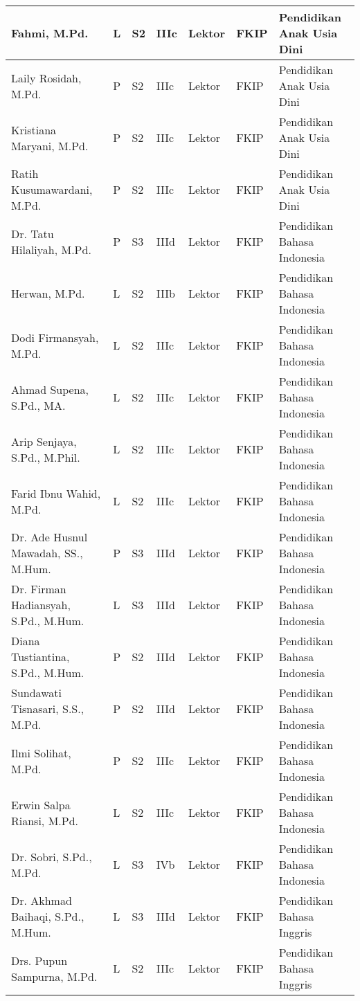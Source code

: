 \documentclass[
]{book}
\begin{document}
\begin{longtable}{l|l|l|l|l|l|l}
\hline
Fahmi, M.Pd. & L & S2 & IIIc & Lektor & FKIP & Pendidikan Anak Usia Dini\\
\hline
Laily Rosidah, M.Pd. & P & S2 & IIIc & Lektor & FKIP & Pendidikan Anak Usia Dini\\
\hline
Kristiana Maryani, M.Pd. & P & S2 & IIIc & Lektor & FKIP & Pendidikan Anak Usia Dini\\
\hline
Ratih Kusumawardani, M.Pd. & P & S2 & IIIc & Lektor & FKIP & Pendidikan Anak Usia Dini\\
\hline
Dr. Tatu Hilaliyah, M.Pd. & P & S3 & IIId & Lektor & FKIP & Pendidikan Bahasa Indonesia\\
\hline
Herwan, M.Pd. & L & S2 & IIIb & Lektor & FKIP & Pendidikan Bahasa Indonesia\\
\hline
Dodi Firmansyah, M.Pd. & L & S2 & IIIc & Lektor & FKIP & Pendidikan Bahasa Indonesia\\
\hline
Ahmad Supena, S.Pd., MA. & L & S2 & IIIc & Lektor & FKIP & Pendidikan Bahasa Indonesia\\
\hline
Arip Senjaya, S.Pd., M.Phil. & L & S2 & IIIc & Lektor & FKIP & Pendidikan Bahasa Indonesia\\
\hline
Farid Ibnu Wahid, M.Pd. & L & S2 & IIIc & Lektor & FKIP & Pendidikan Bahasa Indonesia\\
\hline
Dr. Ade Husnul Mawadah, SS., M.Hum. & P & S3 & IIId & Lektor & FKIP & Pendidikan Bahasa Indonesia\\
\hline
Dr. Firman Hadiansyah, S.Pd., M.Hum. & L & S3 & IIId & Lektor & FKIP & Pendidikan Bahasa Indonesia\\
\hline
Diana Tustiantina, S.Pd., M.Hum. & P & S2 & IIId & Lektor & FKIP & Pendidikan Bahasa Indonesia\\
\hline
Sundawati Tisnasari, S.S., M.Pd. & P & S2 & IIId & Lektor & FKIP & Pendidikan Bahasa Indonesia\\
\hline
Ilmi Solihat, M.Pd. & P & S2 & IIIc & Lektor & FKIP & Pendidikan Bahasa Indonesia\\
\hline
Erwin Salpa Riansi, M.Pd. & L & S2 & IIIc & Lektor & FKIP & Pendidikan Bahasa Indonesia\\
\hline
Dr. Sobri, S.Pd., M.Pd. & L & S3 & IVb & Lektor & FKIP & Pendidikan Bahasa Indonesia\\
\hline
Dr. Akhmad Baihaqi, S.Pd., M.Hum. & L & S3 & IIId & Lektor & FKIP & Pendidikan Bahasa Inggris\\
\hline
Drs. Pupun Sampurna, M.Pd. & L & S2 & IIIc & Lektor & FKIP & Pendidikan Bahasa Inggris\\
\hline

\end{longtable}
\end{document}
